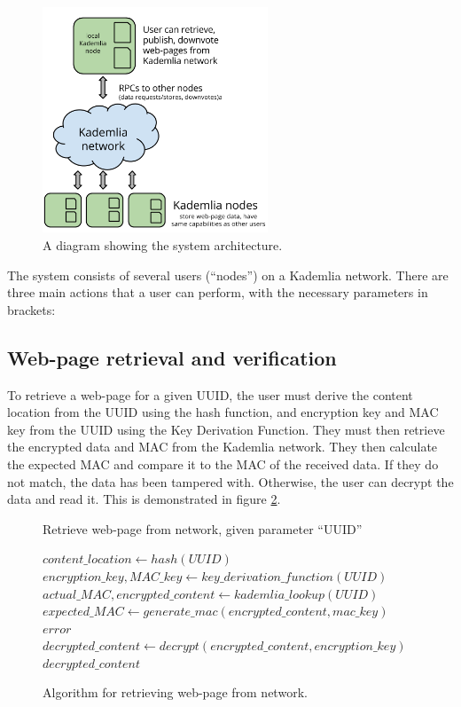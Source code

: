\begin{figure}[H]
    \centering
    \includegraphics[width=0.6\textwidth]{img/arch.png}
    \caption{A diagram showing the system architecture.}
    \label{fig:arch}
\end{figure}

The system consists of several users (``nodes'') on a Kademlia network. There are three main actions that a user can perform,
with the necessary parameters in brackets:

\subsection{Web-page retrieval and verification}

To retrieve a web-page for a given UUID, the user must derive the content location from the UUID using the hash function,
and encryption key and MAC key from the UUID using the Key Derivation Function. They must then retrieve the encrypted data
and MAC from the Kademlia network. They then calculate the expected MAC and compare it to the MAC of the received data. If
they do not match, the data has been tampered with. Otherwise, the user can decrypt the data and read it. This is demonstrated in
figure \ref{fig:retrievalalgo}.

\begin{figure}
    \begin{algorithm}[H]
    \caption{Retrieve web-page from network, given parameter ``UUID''}
    \begin{algorithmic}
        \STATE $content\_location \leftarrow hash(UUID)$
        \STATE $encryption\_key, MAC\_key \leftarrow key\_derivation\_function(UUID) $
        \STATE $actual\_MAC, encrypted\_content \leftarrow kademlia\_lookup(UUID) $
        \STATE $expected\_MAC \leftarrow generate\_mac(encrypted\_content, mac\_key) $
        \RETURN $ error $
        \ENDIF
        \STATE $ decrypted\_content \leftarrow decrypt(encrypted\_content, encryption\_key) $
        \RETURN $ decrypted\_content $
    \end{algorithmic}
    \end{algorithm}
    \caption{Algorithm for retrieving web-page from network.}
    \label{fig:retrievalalgo}
\end{figure}

